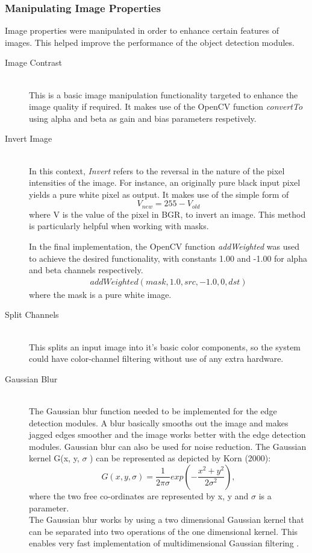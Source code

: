 \subsubsection{Manipulating Image Properties} 
Image properties were manipulated in order to enhance certain features of images. This helped improve the performance of the object detection modules.
\begin{description}
\item[Image Contrast]\hfill \\
This is a basic image manipulation functionality targeted to enhance the image quality if required.
It makes use of the OpenCV function \emph{convertTo} using alpha and beta as gain and bias parameters respetively.

\item[Invert Image]\hfill \\
In this context, \emph{Invert} refers to the reversal in the nature of the pixel intensities of the image.
For instance, an originally pure black input pixel yields a pure white pixel as output.
It makes use of the simple form of  
\begin{equation} V_{new} = 255 - V_{old}  
\end{equation} 
where V is the value of the pixel in BGR, to invert an image. 
This method is particularly helpful when working with masks.

In the final implementation, the OpenCV function \emph{addWeighted} was used to achieve the desired functionality, with constants 1.00 and -1.00 for alpha and beta channels respectively.
\begin{align*}
addWeighted(mask, 1.0, src, -1.0, 0, dst)
\end{align*}
where the mask is a pure white image.

\item[Split Channels]\hfill \\
This splits an input image into it's basic color components, so the system could have color-channel filtering without use of any extra hardware.

\item[Gaussian Blur]\hfill \\
The Gaussian blur function \cite{web:gaussianBlur}  needed to be implemented for the edge detection modules. A blur basically smooths out the image and makes jagged edges smoother and the image works better with the edge detection modules. Gaussian blur can also be used for noise reduction. The Gaussian kernel G(x, y, $\sigma$ ) can be represented as depicted by Korn (2000):
\cite{korn2000mathematical}
\begin{equation}
G(x,y,\sigma)=\frac{1}{2\pi \sigma}exp(-\frac{x^2+y^2}{2\sigma ^2}),
\end{equation}
where the two free co-ordinates are represented by x, y and $\sigma$ is a parameter.
\\The Gaussian blur works by using a two dimensional Gaussian kernel that can be separated into two operations of the one dimensional kernel. This enables very fast implementation of multidimensional Gaussian filtering \cite{korn2000mathematical}.  


\end{description}
